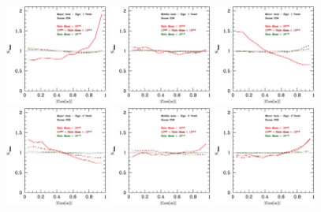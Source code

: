 \documentclass[usenatbib]{mn2e}
\begin{document}
\begin{figure}
\includegraphics[width=0.30\textwidth]{../plot2/Ax1_VT/256_AX1_V1.ps}
\includegraphics[width=0.30\textwidth]{../plot2/Ax2_VT/256_AX2_V1.ps}
\includegraphics[width=0.30\textwidth]{../plot2/Ax3_VT/256_AX3_V1.ps}
\includegraphics[width=0.30\textwidth]{../plot2/Ax1_VT/256_AX1_V2.ps}
\includegraphics[width=0.30\textwidth]{../plot2/Ax2_VT/256_AX2_V2.ps}
\includegraphics[width=0.30\textwidth]{../plot2/Ax3_VT/256_AX3_V2.ps}

\end{figure}
\end{document}
